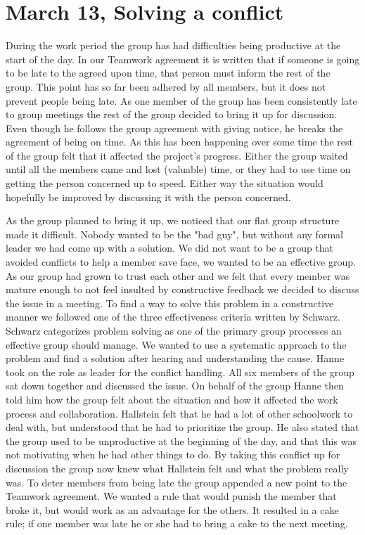 \section{March 13, Solving a conflict}

During the work period the group has had difficulties being productive at the start of the day. In our Teamwork agreement it is written that if someone is going to be late to the agreed upon time, that person must inform the rest of the group. This point has so far been adhered by all members, but it does not prevent people being late. As one member of the group has been consistently  late to group meetings the rest of the group decided to bring it up for discussion. Even though he follows the group agreement with giving notice, he breaks the agreement of being on time. As this has been happening over some time the rest of the group felt that it affected the project's progress. Either the group waited until all the members came and lost (valuable) time, or they had to use time on getting the person concerned up to speed. Either way the situation would hopefully be improved by discussing it with the person concerned.

As the group planned to bring it up, we noticed that our flat group structure made it difficult. Nobody wanted to be the "bad guy", but without any formal leader we had come up with a solution. We did not want to be a group that avoided conflicts to help a member save face, we wanted to be an effective group. As our group had grown to trust each other and we felt that every member was mature enough to not feel insulted by constructive feedback we decided to discuss the issue in a meeting. To find a way to solve this problem in a constructive manner we followed one of the three effectiveness criteria written by Schwarz\cite{WorkGroups}. Schwarz categorizes problem solving as one of the primary group processes an effective group should manage. We wanted to use a systematic approach to the problem and find a solution after hearing and understanding the cause. Hanne took on the role as leader for the conflict handling. All six members of the group sat down together and discussed the issue. On behalf of the group Hanne then told him how the group felt about the situation and how it affected the work process and collaboration. Hallstein felt that he had a lot of other schoolwork to deal with, but understood that he had to prioritize the group. He also stated that the group used to be unproductive at the beginning of the day, and that this was not motivating when he had other things to do. By taking this conflict up for discussion the group now knew what Hallstein felt and what the problem really was. To deter members from being late the group appended a new point to the Teamwork agreement. We wanted a rule that would punish the member that broke it, but would work as an advantage for the others. It resulted in a cake rule; if one member was late he or she had to bring a cake to the next meeting. 

